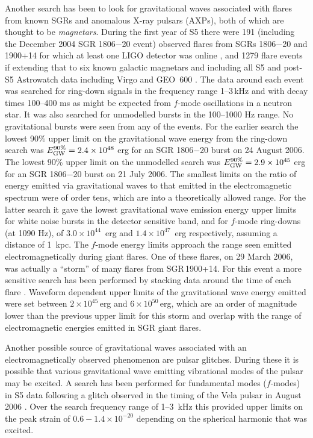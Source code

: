 \documentclass{article}
\begin{document}
Another search has been to look for gravitational waves associated with flares
from known SGRs and anomalous X-ray pulsars (AXPs), both of which are thought to
be {\it magnetars}. During the first year of 
S5 there were 191 (including the
December 2004 SGR 1806$-$20 event) observed flares from SGRs 1806$-$20 and
1900+14 for which at least one LIGO detector was online \cite{Abbott:2008h}, and 1279 flare events if
extending that to six known galactic magnetars and including all S5 and post-S5 Astrowatch 
data including Virgo and GEO~600 \cite{Abadie:2010c}. The
data around each event was searched for ring-down signals in the
frequency range 1--3\,kHz and with decay times 100--400 ms as might be expected
from $f$-mode oscillations in a neutron star. It was also searched for unmodelled
bursts in the 100--1000 Hz range. No gravitational bursts were seen from any of
the events. For the earlier search \cite{Abbott:2008h} the lowest 90\% upper 
limit on the gravitational wave energy from
the ring-down search was $E_{\rm GW}^{90\%} = 2.4\times10^{48}$ erg for an SGR
1806$-$20 burst on 24 August 2006. The lowest 90\% upper limit on the unmodelled
search was $E_{\rm GW}^{90\%} = 2.9\times10^{45}$ erg for an SGR 1806$-$20
burst on 21 July 2006. The smallest limits on the ratio of energy emitted via
gravitational waves to that emitted in the electromagnetic spectrum were of
order tens, which are into a theoretically allowed range. For the latter search
\cite{Abadie:2010c} it gave the lowest gravitational wave emission energy upper 
limits for white noise bursts in the detector sensitive band, 
and for $f$-mode ring-downs (at 1090 Hz), of $3.0\times10^{44}$~erg and $1.4\times10^{47}$~erg 
respectively, assuming a distance of 1~kpc. The $f$-mode energy limits approach the
range seen emitted electromagnetically during giant flares.
One of these flares, on 29 March 2006, was actually a ``storm'' of many flares 
from SGR\,1900+14. For this event a more sensitive search has been performed by stacking data
around the time of each flare \cite{Abbott:2009c}. Waveform dependent upper
limits of the gravitational wave energy emitted were set between
$2\times10^{45}$\,erg and $6\times10^{50}$\,erg, which are an order of magnitude
lower than the previous upper limit for this storm and overlap with the range of
electromagnetic energies emitted in SGR giant flares. 

Another possible source of gravitational waves associated with an  
electromagnetically observed phenomenon are pulsar glitches. During these it is
possible that various gravitational wave emitting vibrational modes of the
pulsar may be excited. A search has been performed for fundamental modes ($f$-modes) 
in S5 data following a glitch observed in the timing of the Vela pulsar 
in August 2006  \cite{Abadie:2010a}. Over the search frequency range of 
1--3~kHz this provided upper limits on the peak strain of $0.6-1.4\times10^{-20}$
depending on the spherical harmonic that was excited.
\end{document}
